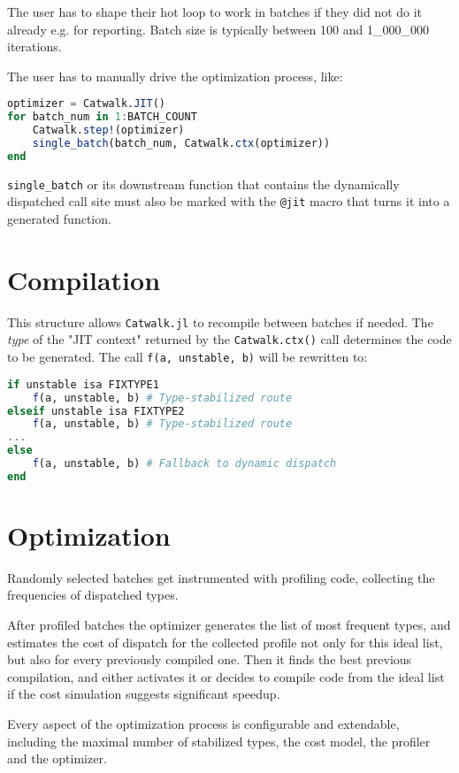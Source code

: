 \documentclass{juliacon}
\begin{document}
The user has to shape their hot loop to work in batches if they did not do it already e.g. for reporting. Batch size is typically between 100 and 1\_000\_000 iterations.

The user has to manually drive the optimization process, like: 

\begin{lstlisting}[language = Julia]
optimizer = Catwalk.JIT()
for batch_num in 1:BATCH_COUNT
    Catwalk.step!(optimizer)
    single_batch(batch_num, Catwalk.ctx(optimizer))
end
\end{lstlisting}

\verb|single_batch|  or its downstream function that contains the dynamically dispatched call site must also be marked with the \verb|@jit|  macro that turns
it into a generated function.

\section {Compilation}

This structure allows \verb|Catwalk.jl| to recompile between batches if needed.
The \emph{type} of the "JIT context" returned by the \verb|Catwalk.ctx()| call
determines the code to be generated. The call \verb|f(a, unstable, b)| will 
be rewritten to:

\begin{lstlisting}[language = Julia]
if unstable isa FIXTYPE1
    f(a, unstable, b) # Type-stabilized route
elseif unstable isa FIXTYPE2
    f(a, unstable, b) # Type-stabilized route
...
else
    f(a, unstable, b) # Fallback to dynamic dispatch
end
\end{lstlisting}

\section {Optimization}

Randomly selected batches get instrumented with profiling code, collecting the frequencies of dispatched types.

After profiled batches the optimizer generates the list of most frequent types, and estimates the cost of dispatch for the collected profile not only for this ideal list, but also for every previously compiled one. Then it finds the best previous compilation,
and either activates it or decides to compile code from the ideal list if the cost simulation suggests significant speedup.

Every aspect of the optimization process is configurable and extendable, including the maximal number
of stabilized types, the cost model, the profiler and the optimizer.
\end{document}
